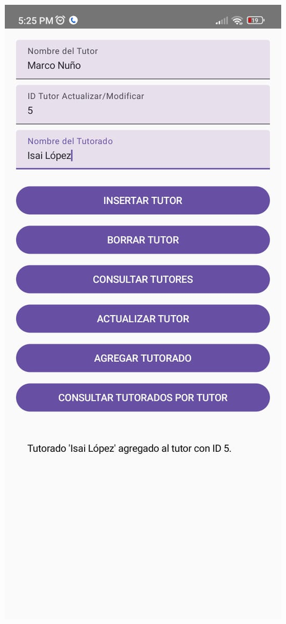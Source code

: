 \documentclass[pdf,
serif,
compress,
xcolor=table,
dvipsnames,
spanish,
aspectratio=169]{beamer}
\begin{document}
\begin{frame}
\begin{columns}
        \begin{center}
            \includegraphics[width=0.7\linewidth]{graphics/AgregarTutorado.jpeg} %
        \end{center}
    \end{columns}
\end{frame}
\end{document}
